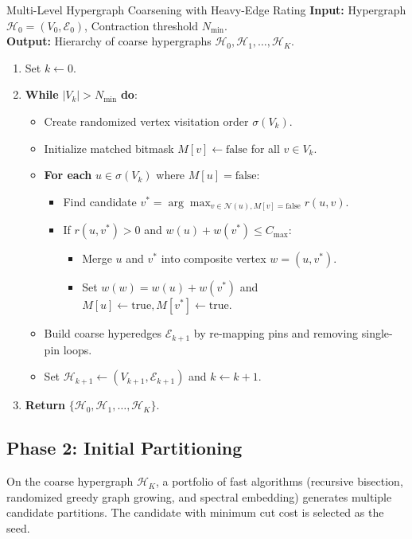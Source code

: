 \begin{algorithmbox}{Multi-Level Hypergraph Coarsening with Heavy-Edge Rating}
\textbf{Input:} Hypergraph $\mathcal{H}_0 = (V_0, \mathcal{E}_0)$, Contraction threshold $N_{\min}$.\\
\textbf{Output:} Hierarchy of coarse hypergraphs $\mathcal{H}_0, \mathcal{H}_1, \dots, \mathcal{H}_K$.

\begin{enumerate}[leftmargin=1.5em]
    \item Set $k \leftarrow 0$.
    \item \textbf{While} $|V_k| > N_{\min}$ \textbf{do}:
    \begin{itemize}
        \item Create randomized vertex visitation order $\sigma(V_k)$.
        \item Initialize matched bitmask $M[v] \leftarrow \text{false}$ for all $v \in V_k$.
        \item \textbf{For each} $u \in \sigma(V_k)$ where $M[u] = \text{false}$:
        \begin{itemize}
            \item Find candidate $v^* = \arg\max_{v \in \mathcal{N}(u), M[v]=\text{false}} r(u, v)$.
            \item If $r(u, v^*) > 0$ and $w(u) + w(v^*) \le C_{\max}$:
            \begin{itemize}
                \item Merge $u$ and $v^*$ into composite vertex $w = (u, v^*)$.
                \item Set $w(w) = w(u) + w(v^*)$ and $M[u] \leftarrow \text{true}, M[v^*] \leftarrow \text{true}$.
            \end{itemize}
        \end{itemize}
        \item Build coarse hyperedges $\mathcal{E}_{k+1}$ by re-mapping pins and removing single-pin loops.
        \item Set $\mathcal{H}_{k+1} \leftarrow (V_{k+1}, \mathcal{E}_{k+1})$ and $k \leftarrow k + 1$.
    \end{itemize}
    \item \textbf{Return} $\{\mathcal{H}_0, \mathcal{H}_1, \dots, \mathcal{H}_K\}$.
\end{enumerate}
\end{algorithmbox}

\subsection{Phase 2: Initial Partitioning}
On the coarse hypergraph $\mathcal{H}_K$, a portfolio of fast algorithms (recursive bisection, randomized greedy graph growing, and spectral embedding) generates multiple candidate partitions. The candidate with minimum cut cost is selected as the seed.

